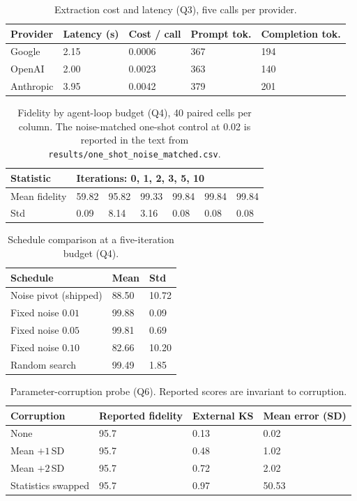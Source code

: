\documentclass[letterpaper]{article}
\begin{document}
\begin{table}[t]
\centering
\begin{tabular}{lllll}
\toprule
Provider & Latency (s) & Cost / call & Prompt tok. & Completion tok. \\
\midrule
Google & 2.15 & 0.0006 & 367 & 194 \\
OpenAI & 2.00 & 0.0023 & 363 & 140 \\
Anthropic & 3.95 & 0.0042 & 379 & 201 \\
\bottomrule
\end{tabular}
\caption{Extraction cost and latency (Q3), five calls per provider.}
\label{tab:provider}
\end{table}

\begin{table}[t]
\centering
\begin{tabular}{lllllll}
\toprule
Statistic & \multicolumn{6}{l}{Iterations: 0, 1, 2, 3, 5, 10} \\
\midrule
Mean fidelity & 59.82 & 95.82 & 99.33 & 99.84 & 99.84 & 99.84 \\
Std & 0.09 & 8.14 & 3.16 & 0.08 & 0.08 & 0.08 \\
\bottomrule
\end{tabular}
\caption{Fidelity by agent-loop budget (Q4), 40 paired cells per column. The
noise-matched one-shot control at 0.02 is reported in the text from
\texttt{results/one\_shot\_noise\_matched.csv}.}
\label{tab:noise}
\end{table}

\begin{table}[t]
\centering
\begin{tabular}{lll}
\toprule
Schedule & Mean & Std \\
\midrule
Noise pivot (shipped) & 88.50 & 10.72 \\
Fixed noise $0.01$ & 99.88 & 0.09 \\
Fixed noise $0.05$ & 99.81 & 0.69 \\
Fixed noise $0.10$ & 82.66 & 10.20 \\
Random search & 99.49 & 1.85 \\
\bottomrule
\end{tabular}
\caption{Schedule comparison at a five-iteration budget (Q4).}
\label{tab:pivot}
\end{table}

\begin{table}[t]
\centering
\begin{tabular}{llll}
\toprule
Corruption & Reported fidelity & External KS & Mean error (SD) \\
\midrule
None & 95.7 & 0.13 & 0.02 \\
Mean $+1$\,SD & 95.7 & 0.48 & 1.02 \\
Mean $+2$\,SD & 95.7 & 0.72 & 2.02 \\
Statistics swapped & 95.7 & 0.97 & 50.53 \\
\bottomrule
\end{tabular}
\caption{Parameter-corruption probe (Q6). Reported scores are invariant to corruption.}
\label{tab:validity}
\end{table}
\end{document}
